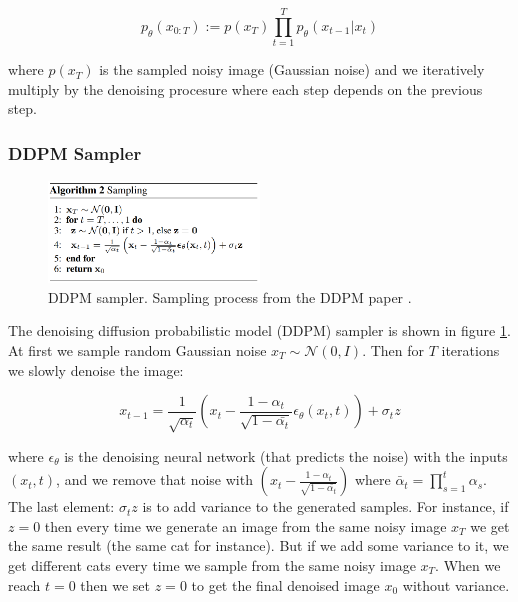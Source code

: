 \[ p_\theta (x_{0:T}) := p(x_T) \prod_{t=1}^{T} p_\theta (x_{t-1} | x_t) \]

where $p(x_T)$ is the sampled noisy image (Gaussian noise) and we iteratively multiply by the denoising procesure where each step depends on the previous step.









\subsubsection{DDPM Sampler}

\begin{figure}
    \centering
    \includegraphics[width=0.5\textwidth]{images/appendix/dm_samplers/ddpm.png}
    \caption{DDPM sampler. Sampling process from the DDPM paper \cite{ddpm}.}
    \label{fig:appendix_ddpm_sampling}
\end{figure}

The denoising diffusion probabilistic model (DDPM) sampler is shown in figure \ref{fig:appendix_ddpm_sampling}. At first we sample random Gaussian noise $x_T \sim \mathcal{N} (0, I)$. Then for $T$ iterations we slowly denoise the image:

\[ x_{t-1} = \frac{1}{\sqrt{\alpha_t}} \left( x_t - \frac{1 - \alpha_t}{\sqrt{1 - \bar{\alpha_t}}} \epsilon_\theta (x_t, t) \right) + \sigma_t z \]

where $\epsilon_\theta$ is the denoising neural network (that predicts the noise) with the inputs $(x_t, t)$, and we remove that noise with $\left( x_t - \frac{1 - \alpha_t}{\sqrt{1 - \bar{\alpha_t}}} \right)$ where $\bar{\alpha}_t = \prod_{s=1}^{t} \alpha_s$. The last element: $\sigma_t z$ is to add variance to the generated samples. For instance, if $z=0$ then every time we generate an image from the same noisy image $x_T$ we get the same result (the same cat for instance). But if we add some variance to it, we get different cats every time we sample from the same noisy image $x_T$. When we reach $t=0$ then we set $z=0$ to get the final denoised image $x_0$ without variance.








